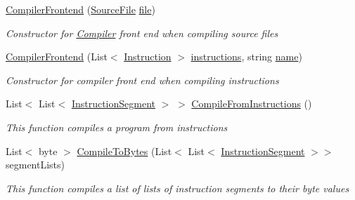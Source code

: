 \begin{DoxyCompactItemize}
\item 
\hyperlink{class_c_p_u___o_s___simulator_1_1_compiler_1_1_compiler_frontend_ac3122a57986de8d3bfb16a78af8e49a1}{Compiler\+Frontend} (\hyperlink{class_c_p_u___o_s___simulator_1_1_compiler_1_1_source_file}{Source\+File} \hyperlink{class_c_p_u___o_s___simulator_1_1_compiler_1_1_compiler_frontend_a57d54910e0df9189cf333b95d9123641}{file})
\begin{DoxyCompactList}\small\item\em Constructor for \hyperlink{namespace_c_p_u___o_s___simulator_1_1_compiler}{Compiler} front end when compiling source files \end{DoxyCompactList}\item 
\hyperlink{class_c_p_u___o_s___simulator_1_1_compiler_1_1_compiler_frontend_a57babee24613e50fd2b9ed00578d707e}{Compiler\+Frontend} (List$<$ \hyperlink{class_c_p_u___o_s___simulator_1_1_c_p_u_1_1_instruction}{Instruction} $>$ \hyperlink{class_c_p_u___o_s___simulator_1_1_compiler_1_1_compiler_frontend_aec71846f593e4bdcbd7d63a49b3b25bd}{instructions}, string \hyperlink{class_c_p_u___o_s___simulator_1_1_compiler_1_1_compiler_frontend_a2b4facf897341f61d4db60dc7fdc67c4}{name})
\begin{DoxyCompactList}\small\item\em Constructor for compiler front end when compiling instructions \end{DoxyCompactList}\item 
List$<$ List$<$ \hyperlink{class_c_p_u___o_s___simulator_1_1_compiler_1_1_instruction_segment}{Instruction\+Segment} $>$ $>$ \hyperlink{class_c_p_u___o_s___simulator_1_1_compiler_1_1_compiler_frontend_abe29382de80d0cc7c0803477b6904850}{Compile\+From\+Instructions} ()
\begin{DoxyCompactList}\small\item\em This function compiles a program from instructions \end{DoxyCompactList}\item 
List$<$ byte $>$ \hyperlink{class_c_p_u___o_s___simulator_1_1_compiler_1_1_compiler_frontend_adcf4f8a206954bd1b4aa637430c630fb}{Compile\+To\+Bytes} (List$<$ List$<$ \hyperlink{class_c_p_u___o_s___simulator_1_1_compiler_1_1_instruction_segment}{Instruction\+Segment} $>$$>$ segment\+Lists)
\begin{DoxyCompactList}\small\item\em This function compiles a list of lists of instruction segments to their byte values \end{DoxyCompactList}\end{DoxyCompactItemize}
